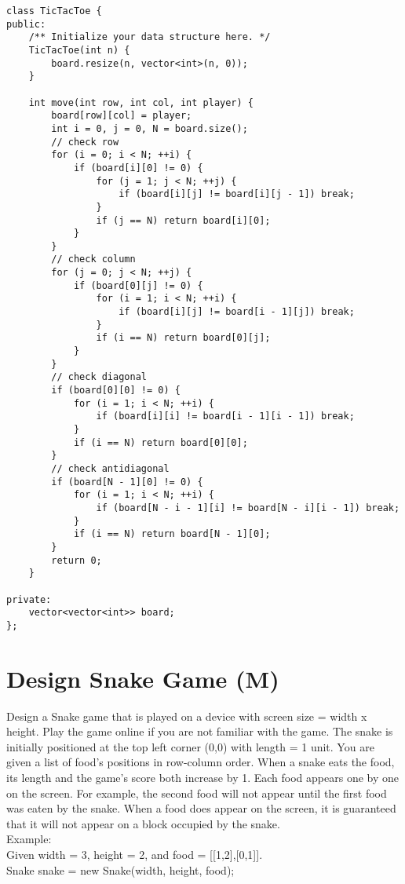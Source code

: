 \begin{lstlisting}
class TicTacToe {
public:
    /** Initialize your data structure here. */
    TicTacToe(int n) {
        board.resize(n, vector<int>(n, 0));   
    }

    int move(int row, int col, int player) {
        board[row][col] = player;
        int i = 0, j = 0, N = board.size();
        // check row
        for (i = 0; i < N; ++i) {
            if (board[i][0] != 0) {
                for (j = 1; j < N; ++j) {
                    if (board[i][j] != board[i][j - 1]) break;
                }
                if (j == N) return board[i][0];
            }
        }
        // check column
        for (j = 0; j < N; ++j) {
            if (board[0][j] != 0) {
                for (i = 1; i < N; ++i) {
                    if (board[i][j] != board[i - 1][j]) break;
                }
                if (i == N) return board[0][j];
            }
        }
        // check diagonal
        if (board[0][0] != 0) {
            for (i = 1; i < N; ++i) {
                if (board[i][i] != board[i - 1][i - 1]) break;
            }
            if (i == N) return board[0][0];
        }
        // check antidiagonal
        if (board[N - 1][0] != 0) {
            for (i = 1; i < N; ++i) {
                if (board[N - i - 1][i] != board[N - i][i - 1]) break;
            }
            if (i == N) return board[N - 1][0];
        }
        return 0;
    }
    
private:
    vector<vector<int>> board;
};
\end{lstlisting}


\section{Design Snake Game (M)}
Design a Snake game that is played on a device with screen size = width x height. Play the game online if you are not familiar with the game. The snake is initially positioned at the top left corner (0,0) with length = 1 unit. You are given a list of food's positions in row-column order. When a snake eats the food, its length and the game's score both increase by 1. Each food appears one by one on the screen. For example, the second food will not appear until the first food was eaten by the snake. When a food does appear on the screen, it is guaranteed that it will not appear on a block occupied by the snake.\\

Example:\\
Given width = 3, height = 2, and food = [[1,2],[0,1]].\\
Snake snake = new Snake(width, height, food);\\

